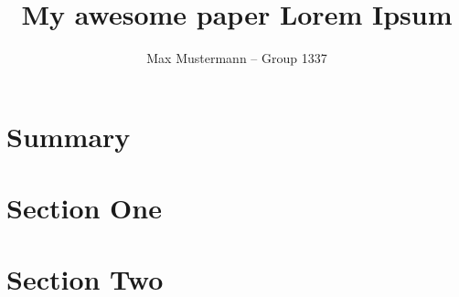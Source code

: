 \documentclass[
    a4paper,
    doc,
    11pt,
]{apa6}
\title{
    My awesome paper \newline
    Lorem Ipsum
}
\author{Max Mustermann – Group 1337}
\affiliation{Julius-Maximilians Universität}
\begin{document}
\maketitle

\newpage
\tableofcontents

\newpage
\section{Summary}


\newpage
\section{Section One}


\newpage
\section{Section Two}



\newpage
\end{document}
